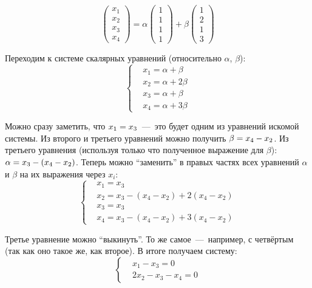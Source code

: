 \documentclass[a4paper,12pt]{article}
\begin{document}
  \begin{solution}
    \[
      \begin{pmatrix}
        x_1 \\ x_2 \\ x_3 \\ x_4
      \end{pmatrix} = \alpha \begin{pmatrix}
        1 \\ 1 \\ 1 \\ 1
      \end{pmatrix} + \beta \begin{pmatrix}
        1 \\ 2 \\ 1 \\ 3
      \end{pmatrix}
    \]
    
    Переходим к системе скалярных уравнений (относительно $\alpha$, $\beta$):
    \begin{equation}\label{p-20-23-system}
      \left\{
        \begin{aligned}
          &x_1 = \alpha + \beta\\
          &x_2 = \alpha + 2\beta\\
          &x_3 = \alpha + \beta\\
          &x_4 = \alpha + 3\beta
        \end{aligned}
      \right.
    \end{equation}
    
    Можно сразу заметить, что $x_1 \hm= x_3$~---~это будет одним из уравнений искомой системы.
    Из второго и третьего уравнений можно получить $\beta \hm= x_4 \hm- x_2$.
    Из третьего уравнения (используя только что полученное выражение для $\beta$): $\alpha \hm= x_3 \hm- (x_4 \hm- x_2)$.
    Теперь можно ``заменить'' в правых частях всех уравнений $\alpha$ и $\beta$ на их выражения через $x_i$:
    \[
      \left\{
        \begin{aligned}
          &x_1 = x_3\\
          &x_2 = x_3 - (x_4 - x_2) + 2(x_4 - x_2)\\
          &x_3 = x_3\\
          &x_4 = x_3 - (x_4 - x_2) + 3(x_4 - x_2)
        \end{aligned}
      \right.
    \]
    
    Третье уравнение можно ``выкинуть''.
    То же самое~---~например, с четвёртым (так как оно такое же, как второе).
    В итоге получаем систему:
    \[
      \left\{
        \begin{aligned}
          &x_1 - x_3 = 0\\
          &2x_2 - x_3 - x_4 = 0
        \end{aligned}
      \right.
    \]
    

\end{solution}
\end{document}
